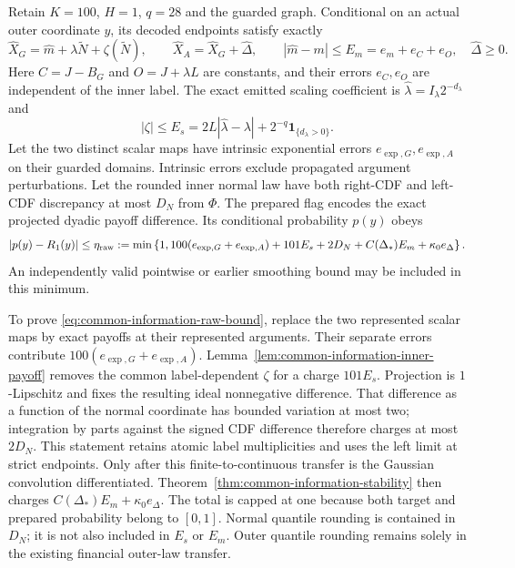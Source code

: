 \documentclass[11pt]{article}
\begin{document}
Retain $K=100$, $H=1$, $q=28$ and the guarded graph. Conditional on an
actual outer coordinate $y$, its decoded endpoints satisfy exactly
\begin{equation}
 \widehat X_G=\widehat m+\lambda\widetilde N+\zeta(\widetilde N),\qquad
 \widehat X_A=\widehat X_G+\widehat\Delta,\qquad
 |\widehat m-m|\leq E_m=e_m+e_C+e_O,\quad
 \widehat\Delta\geq0.
 \label{eq:common-information-raw-endpoints}
\end{equation}
Here $C=J-B_G$ and $O=J+\lambda L$ are constants, and their errors
$e_C,e_O$ are independent of the inner label. The exact emitted scaling
coefficient is $\widehat\lambda=I_\lambda2^{-d_\lambda}$ and
\begin{equation}
 |\zeta|\leq E_s=2L|\widehat\lambda-\lambda|
                    +2^{-q}\mathbf1_{\{d_\lambda>0\}}.
 \label{eq:common-information-scale-error}
\end{equation}
Let the two distinct scalar maps have intrinsic exponential errors
$e_{\exp,G},e_{\exp,A}$ on their guarded domains. Intrinsic errors exclude
propagated argument perturbations. Let the rounded inner normal law have
both right-CDF and left-CDF discrepancy at most $D_N$ from $\Phi$.
The prepared flag encodes the exact projected dyadic payoff difference.
Its conditional probability $p(y)$ obeys
\begin{equation}
 |p(y)-R_1(y)|\leq\eta_{\rm raw}:=
 \min\left\{1,100(e_{\exp,G}+e_{\exp,A})+101E_s+2D_N
                       +C(\Delta_*)E_m+\kappa_0e_\Delta\right\}.
 \label{eq:common-information-raw-bound}
\end{equation}
An independently valid pointwise or earlier smoothing bound may be
included in this minimum.

To prove \eqref{eq:common-information-raw-bound}, replace the two
represented scalar maps by exact payoffs at their represented arguments.
Their separate errors contribute $100(e_{\exp,G}+e_{\exp,A})$.
Lemma~\ref{lem:common-information-inner-payoff} removes the common
label-dependent $\zeta$ for a charge $101E_s$. Projection is
$1$-Lipschitz and fixes the resulting ideal nonnegative difference.
That difference as a function of the normal coordinate has bounded
variation at most two; integration by parts against the signed CDF
difference therefore charges at most $2D_N$. This statement retains
atomic label multiplicities and uses the left limit at strict endpoints.
Only after this finite-to-continuous transfer is the Gaussian
convolution differentiated. Theorem~\ref{thm:common-information-stability}
then charges $C(\Delta_*)E_m+\kappa_0e_\Delta$. The total is capped at one
because both target and prepared probability belong to $[0,1]$.
Normal quantile rounding is contained in $D_N$; it is not also included
in $E_s$ or $E_m$. Outer quantile rounding remains solely in the existing
financial outer-law transfer.
\end{document}
